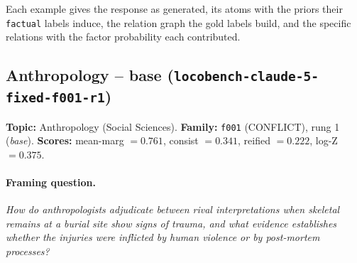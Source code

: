 \documentclass[11pt]{article}
\begin{document}
Each example gives the response as generated, its atoms with the priors their \texttt{factual} labels induce, the relation graph the gold labels build, and the specific relations with the factor probability each contributed.

\subsection{Anthropology -- base (\texttt{locobench-claude-5-fixed-f001-r1})}

\textbf{Topic:} Anthropology (Social Sciences). \textbf{Family:} \texttt{f001} (CONFLICT), rung 1 (\emph{base}). \textbf{Scores:} mean-marg $= 0.761$, consist $= 0.341$, reified $= 0.222$, log-Z $= 0.375$.



\paragraph{Framing question.} \emph{How do anthropologists adjudicate between rival interpretations when skeletal remains at a burial site show signs of trauma, and what evidence establishes whether the injuries were inflicted by human violence or by post-mortem processes?}
\end{document}
